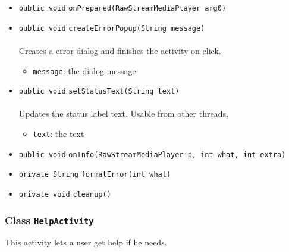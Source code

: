 \begin{itemize}
\item \lstinline|public void| \lstinline|onPrepared|\lstinline|(RawStreamMediaPlayer arg0)| \\[-0.6em]




\item \lstinline|public void| \lstinline|createErrorPopup|\lstinline|(String message)|\\ \\[-0.6em]
Creates a error dialog and finishes the activity on click.
\begin{itemize}
\item \lstinline|message|: the dialog message
\end{itemize}



\item \lstinline|public void| \lstinline|setStatusText|\lstinline|(String text)|\\ \\[-0.6em]
Updates the status label text. Usable from other threads,
\begin{itemize}
\item \lstinline|text|: the text
\end{itemize}



\item \lstinline|public void| \lstinline|onInfo|\lstinline|(RawStreamMediaPlayer p, int what, int extra)| \\[-0.6em]




\item \lstinline|private String| \lstinline|formatError|\lstinline|(int what)| \\[-0.6em]




\item \lstinline|private void| \lstinline|cleanup|\lstinline|()| \\[-0.6em]




\end{itemize}

\subsubsection{Class \lstinline|HelpActivity|}
This activity lets a user get help if he needs. \\
\noindent\begin{minipage}[t]{5cm}
\vspace{0.3em}
\hspace*{2em}
\vspace{0.3em}
\end{minipage}



